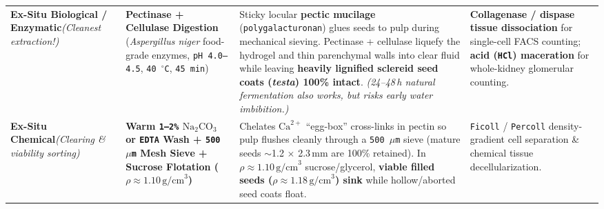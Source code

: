 \documentclass[10pt,a4paper]{article}
\begin{document}
{\begin{xltabular}{\textwidth}{L{2.55cm} L{4.25cm} Y L{3.35cm}}
\textbf{Ex-Situ Biological / Enzymatic}\newline \textit{(Cleanest extraction!)} &
\textbf{Pectinase + Cellulase Digestion} (\textit{Aspergillus niger} food-grade enzymes, \texttt{pH 4.0--4.5}, \texttt{40\,$^\circ$C}, \texttt{45\,min}) &
Sticky locular \textbf{pectic mucilage} (\texttt{polygalacturonan}) glues seeds to pulp during mechanical sieving. Pectinase + cellulase liquefy the hydrogel and thin parenchymal walls into clear fluid while leaving \textbf{heavily lignified sclereid seed coats (\textit{testa}) 100\% intact}. \textit{(24--48\,h natural fermentation also works, but risks early water imbibition.)} &
\textbf{Collagenase / dispase tissue dissociation} for single-cell FACS counting; \textbf{acid (\texttt{HCl}) maceration} for whole-kidney glomerular counting. \\

\textbf{Ex-Situ Chemical}\newline \textit{(Clearing \& viability sorting)} &
\textbf{Warm \texttt{1--2\%} $\text{Na}_2\text{CO}_3$ or \texttt{EDTA} Wash + \texttt{500\,$\mu$m} Mesh Sieve + Sucrose Flotation ($\rho \approx 1.10\,\text{g/cm}^3$)} &
Chelates $\text{Ca}^{2+}$ ``egg-box'' cross-links in pectin so pulp flushes cleanly through a \texttt{500\,$\mu$m} sieve (mature seeds $\sim$1.2 $\times$ 2.3\,mm are 100\% retained). In $\rho \approx 1.10\,\text{g/cm}^3$ sucrose/glycerol, \textbf{viable filled seeds ($\rho \approx 1.18\,\text{g/cm}^3$) sink} while hollow/aborted seed coats float. &
\texttt{Ficoll} / \texttt{Percoll} density-gradient cell separation \& chemical tissue decellularization. \\


\end{xltabular}}
\end{document}
